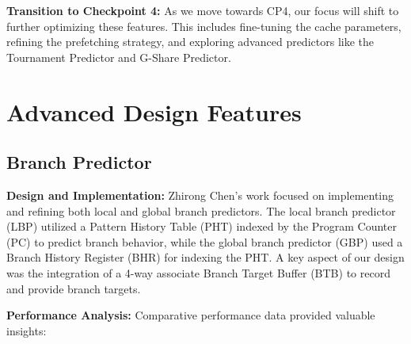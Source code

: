 \documentclass[12pt, a4paper]{article}
\begin{document}
    
    
    \textbf{Transition to Checkpoint 4:}
    As we move towards CP4, our focus will shift to further optimizing these features. This includes fine-tuning the cache parameters, refining the prefetching strategy, and exploring advanced predictors like the Tournament Predictor and G-Share Predictor.







    \section{Advanced Design Features}

    \subsection{Branch Predictor}

    \textbf{Design and Implementation:}
    Zhirong Chen's work focused on implementing and refining both local and global branch predictors. The local branch predictor (LBP) utilized a Pattern History Table (PHT) indexed by the Program Counter (PC) to predict branch behavior, while the global branch predictor (GBP) used a Branch History Register (BHR) for indexing the PHT. A key aspect of our design was the integration of a 4-way associate Branch Target Buffer (BTB) to record and provide branch targets.
    
    \textbf{Performance Analysis:}
    Comparative performance data provided valuable insights:
    
\end{document}
